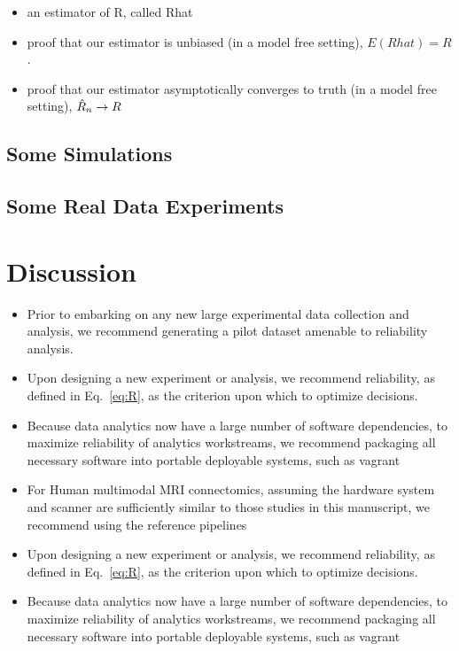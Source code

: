 \documentclass{article}
\begin{document}
\begin{itemize}
\item an estimator of R, called Rhat

\item proof that our estimator is unbiased (in a model free setting), 
$E(Rhat)=R$.

\item proof that our estimator asymptotically converges to truth (in a model free setting), $\hat{R}_n \rightarrow R$
\end{itemize}

\subsection{Some Simulations}

\subsection{Some Real Data Experiments}



\section{Discussion}





\begin{itemize}
\item Prior to embarking on any new large experimental data collection and analysis, we recommend generating a pilot dataset amenable to reliability analysis.
\item Upon designing a new experiment or analysis, we recommend reliability, as defined in Eq.~\eqref{eq:R}, as the criterion upon which to optimize decisions.
\item Because data analytics now have a large number of software dependencies, to maximize reliability of analytics workstreams, we recommend packaging all necessary software into portable deployable systems, such as vagrant
\item For Human multimodal MRI connectomics, assuming the hardware system and scanner are sufficiently similar to those studies in this manuscript, we recommend using the reference pipelines  
\end{itemize}


\begin{itemize}
\item Upon designing a new experiment or analysis, we recommend reliability, as defined in Eq.~\eqref{eq:R}, as the criterion upon which to optimize decisions.
\item Because data analytics now have a large number of software dependencies, to maximize reliability of analytics workstreams, we recommend packaging all necessary software into portable deployable systems, such as vagrant
\end{itemize}
\end{document}
